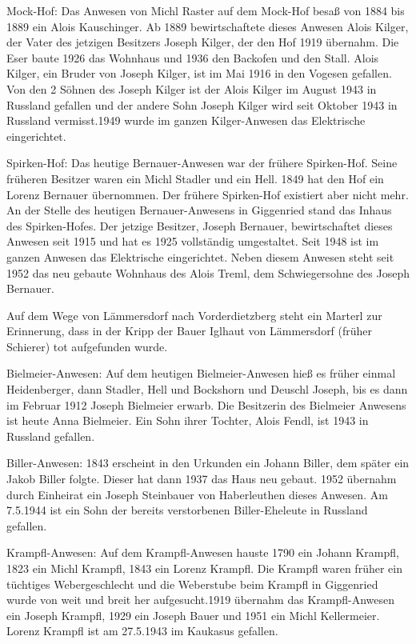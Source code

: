 Mock-Hof: Das Anwesen von Michl Raster auf dem Mock-Hof besaß von 1884 bis 1889
ein Alois Kauschinger. Ab 1889 bewirtschaftete dieses Anwesen Alois Kilger, der
Vater des jetzigen Besitzers Joseph Kilger, der den Hof 1919 übernahm. Die Eser
baute 1926 das Wohnhaus und 1936 den Backofen und den Stall. Alois Kilger, ein
Bruder von Joseph Kilger, ist im Mai 1916 in den Vogesen gefallen. Von den 2
Söhnen des Joseph Kilger ist der Alois Kilger im August 1943 in Russland
gefallen und der andere Sohn Joseph Kilger wird seit Oktober 1943 in Russland
vermisst.1949 wurde im ganzen Kilger-Anwesen das Elektrische eingerichtet.

Spirken-Hof: Das heutige Bernauer-Anwesen war der frühere Spirken-Hof. Seine
früheren Besitzer waren ein Michl Stadler und ein Hell. 1849 hat den Hof ein
Lorenz Bernauer übernommen. Der frühere Spirken-Hof existiert aber nicht mehr.
An der Stelle des heutigen Bernauer-Anwesens in Giggenried stand das Inhaus des
Spirken-Hofes. Der jetzige Besitzer, Joseph Bernauer, bewirtschaftet dieses
Anwesen seit 1915 und hat es 1925 vollständig umgestaltet. Seit 1948 ist im
ganzen Anwesen das Elektrische eingerichtet. Neben diesem Anwesen steht seit
1952 das neu gebaute Wohnhaus des Alois Treml, dem Schwiegersohne des Joseph
Bernauer.

Auf dem Wege von Lämmersdorf nach Vorderdietzberg steht ein Marterl zur
Erinnerung, dass in der Kripp der Bauer Iglhaut von Lämmersdorf (früher
Schierer) tot aufgefunden wurde.

Bielmeier-Anwesen: Auf dem heutigen Bielmeier-Anwesen hieß es früher einmal
Heidenberger, dann Stadler, Hell und Bockshorn und Deuschl Joseph, bis es dann
im Februar 1912 Joseph Bielmeier erwarb. Die Besitzerin des Bielmeier Anwesens
ist heute Anna Bielmeier. Ein Sohn ihrer Tochter, Alois Fendl, ist 1943 in
Russland gefallen.

Biller-Anwesen: 1843 erscheint in den Urkunden ein Johann Biller, dem später ein
Jakob Biller folgte. Dieser hat dann 1937 das Haus neu gebaut. 1952 übernahm
durch Einheirat ein Joseph Steinbauer von Haberleuthen dieses Anwesen. Am
7.5.1944 ist ein Sohn der bereits verstorbenen Biller-Eheleute in Russland
gefallen.

Krampfl-Anwesen: Auf dem Krampfl-Anwesen hauste 1790 ein Johann Krampfl, 1823
ein Michl Krampfl, 1843 ein Lorenz Krampfl. Die Krampfl waren früher ein
tüchtiges Webergeschlecht und die Weberstube beim Krampfl in Giggenried wurde
von weit und breit her aufgesucht.1919 übernahm das Krampfl-Anwesen ein Joseph
Krampfl, 1929 ein Joseph Bauer und 1951 ein Michl Kellermeier. Lorenz Krampfl
ist am 27.5.1943 im Kaukasus gefallen.

